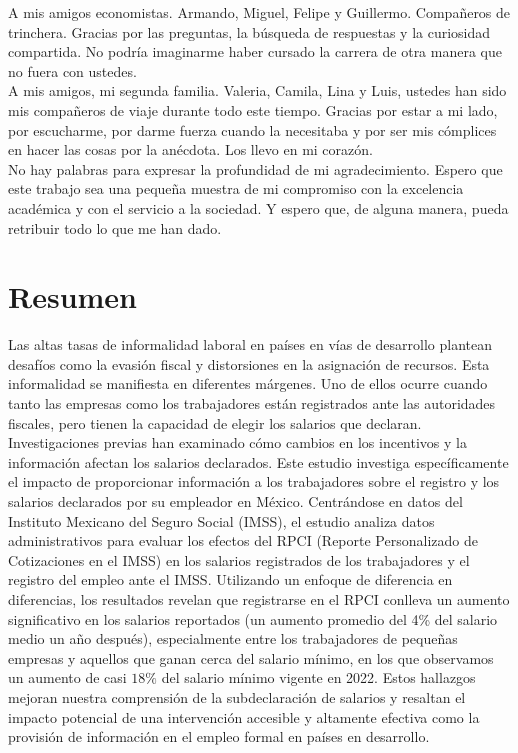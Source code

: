 \documentclass[10pt, oneside]{book}
\begin{document}
\noindent A mis amigos economistas. Armando, Miguel, Felipe y Guillermo. Compañeros de trinchera. Gracias por las preguntas, la búsqueda de respuestas y la curiosidad compartida. No podría imaginarme haber cursado la carrera de otra manera que no fuera con ustedes. \\

\noindent A mis amigos, mi segunda familia. Valeria, Camila, Lina y Luis, ustedes han sido mis compañeros de viaje durante todo este tiempo. Gracias por estar a mi lado, por escucharme, por darme fuerza cuando la necesitaba y por ser mis cómplices en hacer las cosas por la anécdota. Los llevo en mi corazón. \\

\noindent No hay palabras para expresar la profundidad de mi agradecimiento. Espero que este trabajo sea una pequeña muestra de mi compromiso con la excelencia académica y con el servicio a la sociedad. Y espero que, de alguna manera, pueda retribuir todo lo que me han dado.


\chapter*{Resumen}

\noindent Las altas tasas de informalidad laboral en países en vías de desarrollo plantean desafíos como la evasión fiscal y distorsiones en la asignación de recursos. Esta informalidad se manifiesta en diferentes márgenes. Uno de ellos ocurre cuando tanto las empresas como los trabajadores están registrados ante las autoridades fiscales, pero tienen la capacidad de elegir los salarios que declaran. Investigaciones previas han examinado cómo cambios en los incentivos y la información afectan los salarios declarados. Este estudio investiga específicamente el impacto de proporcionar información a los trabajadores sobre el registro y los salarios declarados por su empleador en México. Centrándose en datos del Instituto Mexicano del Seguro Social (IMSS), el estudio analiza datos administrativos para evaluar los efectos del RPCI (Reporte Personalizado de Cotizaciones en el IMSS) en los salarios registrados de los trabajadores y el registro del empleo ante el IMSS. Utilizando un enfoque de diferencia en diferencias, los resultados revelan que registrarse en el RPCI conlleva un aumento significativo en los salarios reportados (un aumento promedio del 4\% del salario medio un año después), especialmente entre los trabajadores de pequeñas empresas y aquellos que ganan cerca del salario mínimo, en los que observamos un aumento de casi $18\%$ del salario mínimo vigente en 2022. Estos hallazgos mejoran nuestra comprensión de la subdeclaración de salarios y resaltan el impacto potencial de una intervención accesible y altamente efectiva como la provisión de información en el empleo formal en países en desarrollo.
\end{document}
